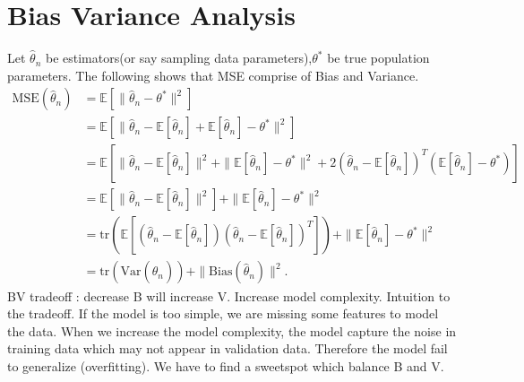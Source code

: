 \documentclass{article}
\begin{document}
\section{Bias Variance Analysis} 
Let \(\hat{\theta}_n\) be estimators(or say sampling data parameters),\(\theta^*\) be true population parameters. The following shows that MSE comprise of Bias and Variance. 
\begin{align*}
\text{MSE}(\hat{\theta}_n) &= \mathbb{E} \left[ \| \hat{\theta}_n - \theta^* \|^2 \right] \\
&= \mathbb{E} \left[ \| \hat{\theta}_n - \mathbb{E}[\hat{\theta}_n] + \mathbb{E}[\hat{\theta}_n] - \theta^* \|^2 \right] \\
&= \mathbb{E} \left[ \| \hat{\theta}_n - \mathbb{E}[\hat{\theta}_n] \|^2 + \| \mathbb{E}[\hat{\theta}_n] - \theta^* \|^2 + 2 (\hat{\theta}_n - \mathbb{E}[\hat{\theta}_n])^T (\mathbb{E}[\hat{\theta}_n] - \theta^*) \right] \\
&= \mathbb{E} \left[ \| \hat{\theta}_n - \mathbb{E}[\hat{\theta}_n] \|^2 \right] + \| \mathbb{E}[\hat{\theta}_n] - \theta^* \|^2 \\
&= \text{tr} \left( \mathbb{E} \left[ (\hat{\theta}_n - \mathbb{E}[\hat{\theta}_n]) (\hat{\theta}_n - \mathbb{E}[\hat{\theta}_n])^T \right] \right) + \| \mathbb{E}[\hat{\theta}_n] - \theta^* \|^2 \\
&= \text{tr} \left( \text{Var}(\hat{\theta}_n) \right) + \| \text{Bias}(\hat{\theta}_n) \|^2.
\end{align*}
\newline
BV tradeoff : decrease B will increase V. Increase model complexity. \newline 
Intuition to the tradeoff.  If the model is too simple, we are missing some features to model the data. When we increase the model complexity, the model capture the noise in training data which may not appear in validation data. Therefore the model fail to generalize (overfitting). \newline
We have to find a sweetspot which balance B and V. \newline
\end{document}
